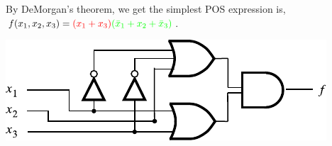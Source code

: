\documentclass[twocolumn]{article}
\newcommand{\bx}{\bar{x}}
\begin{document}
By DeMorgan's theorem, we get the simplest POS expression is, $f(x_1, x_2, x_3) = {\color{red}(x_1 + x_3)}{\color{green}(\bx_1 + x_2 + \bx_3)} $.

\includegraphics[width=\linewidth]{fig/prob-8-pos-circuit.pdf}




\end{document}
